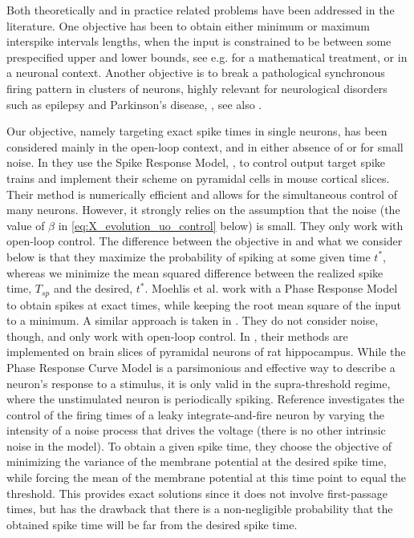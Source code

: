 Both theoretically and in practice related problems have been
addressed in the literature. One objective has been to
obtain either minimum or maximum interspike intervals lengths,
when the input is constrained to be between some prespecified upper
and lower bounds, see e.g. \cite{Lee1994,Lefebvre1987} for a
mathematical treatment, or \cite{Danzl2009,Nabi2012,Wu2009} in a neuronal
context. Another objective is to break a pathological synchronous
firing pattern in clusters of neurons, highly relevant for neurological
disorders such as epilepsy and Parkinson's disease,
\cite{Nabi2013a,Nabi2011}, see also \cite{Feng2007b}.

Our objective, namely targeting exact spike times in single neurons, has been
considered mainly in the open-loop context, and in either absence of or for
small noise. In \cite{Ahmadian2011} they use the Spike Response Model,
\cite{Gerstner2002}, to control output target spike trains and implement their
scheme on pyramidal cells in mouse cortical slices. Their method is numerically
efficient and allows for the simultaneous control of many neurons. However, it strongly relies on the assumption
that the noise (the value of $\beta$ in \cref{eq:X_evolution_uo_control} below) is small.
They only work with open-loop control.
The difference between the objective in \cite{Ahmadian2011} and what we consider
below is that they maximize the probability of spiking at some given time $t^*$, whereas we minimize the mean squared
difference between the realized spike time, $T_{sp}$ and the desired, $t^*$.
Moehlis et al. \cite{Moehlis2006} work with a Phase Response Model to obtain
spikes at exact times, while keeping the root mean square of the input to a
minimum. A similar approach is taken in \cite{Dasanayake2011}. They do not
consider noise, though, and only work with open-loop control. In
\cite{Nabi2013}, their methods are implemented on brain slices of pyramidal
neurons of rat hippocampus. While the
Phase Response Curve Model is a parsimonious and effective way to describe a
neuron's response to a stimulus, it is only valid in the supra-threshold regime,
where the unstimulated neuron is periodically spiking. Reference
\cite{Feng2003} investigates the control of the firing times of a
leaky integrate-and-fire neuron by varying the intensity of a noise process that
drives the voltage (there is no other intrinsic noise in the model). 
To obtain a given spike time, they choose the objective of minimizing the
variance of the membrane potential at the desired spike time, while forcing the
mean of the membrane potential at this time point to equal the threshold. This
provides exact solutions since it does not involve first-passage times, but has
the drawback that there is a non-negligible probability that the obtained spike
time will be far from the desired spike time.

